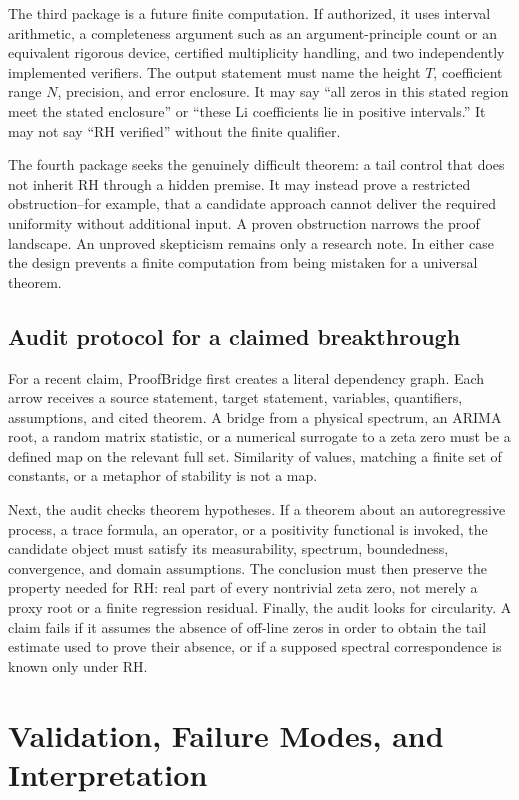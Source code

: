 \documentclass[conference]{../../../../Conference-LaTeX-template_10-17-19/IEEEtran}
\begin{document}
The third package is a future finite computation. If authorized, it uses interval arithmetic, a completeness argument such as an argument-principle count or an equivalent rigorous device, certified multiplicity handling, and two independently implemented verifiers. The output statement must name the height $T$, coefficient range $N$, precision, and error enclosure. It may say ``all zeros in this stated region meet the stated enclosure'' or ``these Li coefficients lie in positive intervals.'' It may not say ``RH verified'' without the finite qualifier.

The fourth package seeks the genuinely difficult theorem: a tail control that does not inherit RH through a hidden premise. It may instead prove a restricted obstruction--for example, that a candidate approach cannot deliver the required uniformity without additional input. A proven obstruction narrows the proof landscape. An unproved skepticism remains only a research note. In either case the design prevents a finite computation from being mistaken for a universal theorem.

\subsection{Audit protocol for a claimed breakthrough}
For a recent claim, ProofBridge first creates a literal dependency graph. Each arrow receives a source statement, target statement, variables, quantifiers, assumptions, and cited theorem. A bridge from a physical spectrum, an ARIMA root, a random matrix statistic, or a numerical surrogate to a zeta zero must be a defined map on the relevant full set. Similarity of values, matching a finite set of constants, or a metaphor of stability is not a map.

Next, the audit checks theorem hypotheses. If a theorem about an autoregressive process, a trace formula, an operator, or a positivity functional is invoked, the candidate object must satisfy its measurability, spectrum, boundedness, convergence, and domain assumptions. The conclusion must then preserve the property needed for RH: real part of every nontrivial zeta zero, not merely a proxy root or a finite regression residual. Finally, the audit looks for circularity. A claim fails if it assumes the absence of off-line zeros in order to obtain the tail estimate used to prove their absence, or if a supposed spectral correspondence is known only under RH.

\section{Validation, Failure Modes, and Interpretation}
\end{document}
